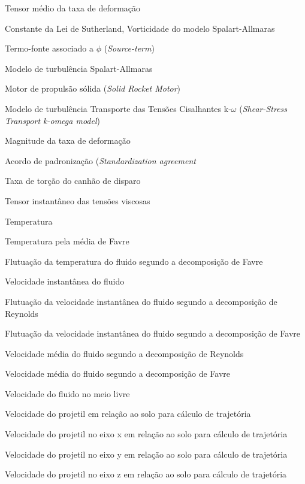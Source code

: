 \begin{siglas}
    \item[\(S_{ij}\)] Tensor médio da taxa de deformação
    \item[\(S\)] Constante da Lei de Sutherland, Vorticidade do modelo Spalart-Allmaras
    \item[\(S_{\phi}\)] Termo-fonte associado a \(\phi\) (\textit{Source-term})
    \item[S-A] Modelo de turbulência Spalart-Allmaras
    \item[SRM] Motor de propulsão sólida (\textit{Solid Rocket Motor})
    \item[SST k-$\omega\)] Modelo de turbulência Transporte das Tensões Cisalhantes k-\(\omega\) (\textit{Shear-Stress Transport k-omega model})
    \item[\(S_t\)] Magnitude da taxa de deformação
    \item[STANAG] Acordo de padronização (\textit{Standardization agreement}
    \item[\(t_c\)] Taxa de torção do canhão de disparo
    \item[\(t_{ij}\)] Tensor instantâneo das tensões viscosas
    \item[\(T\)] Temperatura
    \item[\(\Tilde{T}\)] Temperatura pela média de Favre
    \item[\(T''\)] Flutuação da temperatura do fluido segundo a decomposição de Favre
    \item[\(u_i\)] Velocidade instantânea do fluido
    \item[\(u'_i\)] Flutuação da velocidade instantânea do fluido segundo a decomposição de Reynolds
    \item[\(u''_i\)] Flutuação da velocidade instantânea do fluido segundo a decomposição de Favre
    \item[\(U_i\)] Velocidade média do fluido segundo a decomposição de Reynolds
    \item[\(\Tilde{u}_i\)] Velocidade média do fluido segundo a decomposição de Favre
    \item[\(U_\infty\)] Velocidade do fluido no meio livre
    \item[\(U_{solo}\)] Velocidade do projetil em relação ao solo para cálculo de trajetória
    \item[\(U_{x_{solo}}\)] Velocidade do projetil no eixo x em relação ao solo para cálculo de trajetória
    \item[\(U_{y_{solo}}\)] Velocidade do projetil no eixo y em relação ao solo para cálculo de trajetória
    \item[\(U_{z_{solo}}\)] Velocidade do projetil no eixo z em relação ao solo para cálculo de trajetória

\end{siglas}
